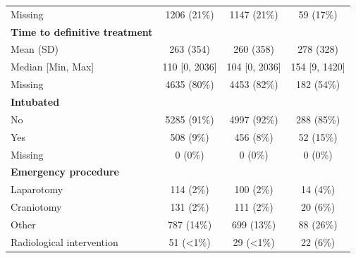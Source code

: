 \documentclass[12pt, a4paper]{article}
\begin{document}
\begin{table}[t!]
{\begin{tabular}{lccc}
            \hspace{3mm}Missing                           & 1206 (21\%)       & 1147 (21\%)       & 59 (17\%)        \\
            \textbf{Time to definitive treatment}         &                   &                   &                  \\
            \hspace{3mm}Mean (SD)                         & 263 (354)         & 260 (358)         & 278 (328)        \\
            \hspace{3mm}Median [Min, Max]                 & 110 [0, 2036]     & 104 [0, 2036]     & 154 [9, 1420]    \\
            \hspace{3mm}Missing                           & 4635 (80\%)       & 4453 (82\%)       & 182 (54\%)       \\
            \textbf{Intubated}                            &                   &                   &                  \\
            \hspace{3mm}No                                & 5285 (91\%)       & 4997 (92\%)       & 288 (85\%)       \\
            \hspace{3mm}Yes                               & 508 (9\%)         & 456 (8\%)         & 52 (15\%)        \\
            \hspace{3mm}Missing                           & 0 (0\%)           & 0 (0\%)           & 0 (0\%)          \\
            \textbf{Emergency procedure}                  &                   &                   &                  \\
            \hspace{3mm}Laparotomy                        & 114 (2\%)         & 100 (2\%)         & 14 (4\%)         \\
            \hspace{3mm}Craniotomy                        & 131 (2\%)         & 111 (2\%)         & 20 (6\%)         \\
            \hspace{3mm}Other                             & 787 (14\%)        & 699 (13\%)        & 88 (26\%)        \\
            \hspace{3mm}Radiological intervention         & 51 (\textless1\%) & 29 (\textless1\%) & 22 (6\%)         \\

\end{tabular}}
\end{table}
\end{document}
